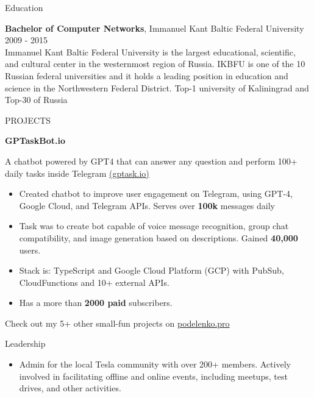 \documentclass{template} %
\begin{document}
\begin{rSection}{Education}

{\bf Bachelor of Computer Networks}, Immanuel Kant Baltic Federal University \hfill {2009 - 2015} \vspace{0.2cm}\\
Immanuel Kant Baltic Federal University is the largest educational, scientific, and cultural center in the westernmost region of Russia. IKBFU is one of the 10 Russian federal universities and it holds a leading position in education and science in the Northwestern Federal District.
Top-1 university of Kaliningrad and Top-30 of Russia \\

\end{rSection}


\begin{rSection}{PROJECTS}
\vspace{-1.25em}
\item \textbf{GPTaskBot.io} {A chatbot powered by GPT4 that can answer any question and perform 100+ daily tasks inside Telegram \href{https://gptask.io/}{(gptask.io)}
    \begin{itemize}
        \itemsep-3pt {} 
        \item Created chatbot to improve user engagement on Telegram, using GPT-4, Google Cloud, and Telegram APIs. Serves over \textbf{100k} messages daily
        \item Task was to create bot capable of voice message recognition, group chat compatibility, and image generation based on descriptions. Gained \textbf{40,000} users.
        \item Stack is: TypeScript and Google Cloud Platform (GCP) with PubSub, CloudFunctions and 10+ external APIs.
        \item Has a more than \textbf{2000 paid} subscribers.
    \end{itemize}
}
Check out my 5+ other small-fun projects on \href{https://podelenko.pro/#fun}{podelenko.pro}
\end{rSection} 


\begin{rSection}{Leadership} 
\begin{itemize}
    \item Admin for the local Tesla community with over 200+ members. Actively involved in facilitating offline and online events, including meetups, test drives, and other activities.
\end{itemize}


\end{rSection}
\end{document}
